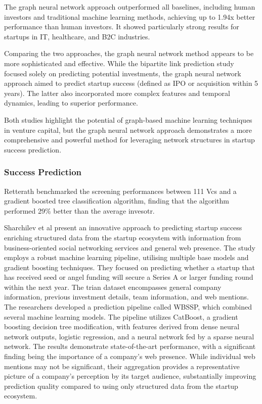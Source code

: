 \documentclass[a4paper, oneside]{discothesis}
\begin{document}
The graph neural network approach outperformed all baselines, including human investors and traditional machine learning methods, achieving up to 1.94x better performance than human investors. It showed particularly strong results for startups in IT, healthcare, and B2C industries.

Comparing the two approaches, the graph neural network method appears to be more sophisticated and effective. While the bipartite link prediction study focused solely on predicting potential investments, the graph neural network approach aimed to predict startup success (defined as IPO or acquisition within 5 years). The latter also incorporated more complex features and temporal dynamics, leading to superior performance.

Both studies highlight the potential of graph-based machine learning techniques in venture capital, but the graph neural network approach demonstrates a more comprehensive and powerful method for leveraging network structures in startup success prediction.

\subsubsection{Success Prediction}

Retterath benchmarked the screening performances between 111 Vcs and a gradient boosted tree classification algorithm, finding that the algorithm performed 29\% better than the average invesotr. 

Sharchilev et al present an innovative approach to predicting startup success enriching structured data from the startup ecosystem with information from business-oriented social networking services and general web presence. The study employs a robust machine learning pipeline, utilising multiple base models and gradient boosting techniques. They focused on predicting whether a startup that has received seed or angel funding will secure a Series A or larger funding round within the next year. The trian dataset encompasses general company information, previous investment details, team information, and web mentions. The researchers developed a prediction pipeline called WBSSP, which combined several machine learning models. The pipeline utilizes CatBoost, a gradient boosting decision tree modification, with features derived from dense neural network outputs, logistic regression, and a neural network fed by a sparse neural network. The results demonstrate state-of-the-art performance, with a significant finding being the importance of a company's web presence. While individual web mentions may not be significant, their aggregation provides a representative picture of a company's perception by its target audience, substantially improving prediction quality compared to using only structured data from the startup ecosystem.
\end{document}
